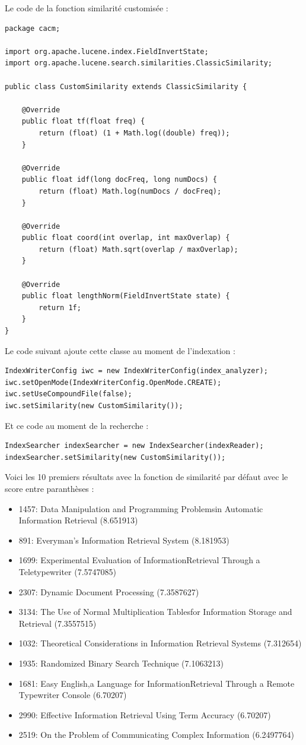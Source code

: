 Le code de la fonction similarité customisée :
\lstset{numbers=left}
\begin{lstlisting}
package cacm;

import org.apache.lucene.index.FieldInvertState;
import org.apache.lucene.search.similarities.ClassicSimilarity;

public class CustomSimilarity extends ClassicSimilarity {

    @Override
    public float tf(float freq) {
        return (float) (1 + Math.log((double) freq));
    }

    @Override
    public float idf(long docFreq, long numDocs) {
        return (float) Math.log(numDocs / docFreq);
    }

    @Override
    public float coord(int overlap, int maxOverlap) {
        return (float) Math.sqrt(overlap / maxOverlap);
    }

    @Override
    public float lengthNorm(FieldInvertState state) {
        return 1f;
    }
}
\end{lstlisting}

Le code suivant ajoute cette classe au moment de l'indexation :
\begin{lstlisting}
IndexWriterConfig iwc = new IndexWriterConfig(index_analyzer);
iwc.setOpenMode(IndexWriterConfig.OpenMode.CREATE);
iwc.setUseCompoundFile(false);
iwc.setSimilarity(new CustomSimilarity());
\end{lstlisting}

Et ce code au moment de la recherche :
\begin{lstlisting}
IndexSearcher indexSearcher = new IndexSearcher(indexReader);
indexSearcher.setSimilarity(new CustomSimilarity());
\end{lstlisting}

Voici les 10 premiers résultats avec la fonction de similarité par défaut avec le score entre paranthèses :

\begin{itemize}
    \item 1457: Data Manipulation and Programming Problemsin Automatic Information Retrieval (8.651913)
    \item 891: Everyman's Information Retrieval System (8.181953)
    \item 1699: Experimental Evaluation of InformationRetrieval Through a Teletypewriter (7.5747085)
    \item 2307: Dynamic Document Processing (7.3587627)
    \item 3134: The Use of Normal Multiplication Tablesfor Information Storage and Retrieval (7.3557515)
    \item 1032: Theoretical Considerations in Information Retrieval Systems (7.312654)
    \item 1935: Randomized Binary Search Technique (7.1063213)
    \item 1681: Easy English,a Language for InformationRetrieval Through a Remote Typewriter Console (6.70207)
    \item 2990: Effective Information Retrieval Using Term Accuracy (6.70207)
    \item 2519: On the Problem of Communicating Complex Information (6.2497764)
\end{itemize}


